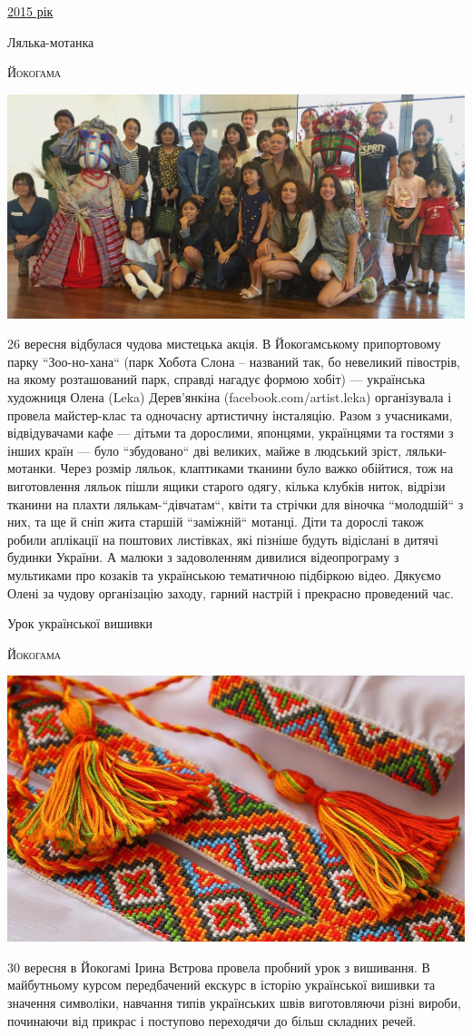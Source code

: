 \documentclass[10pt,a4paper]{article}
\newcommand{\Category}[1]{%
		\begin{center}	
			\Large \usefont{T2A}{kurier}{m}{n}
			\underline{#1}%
		\end{center}	
		\par \normalsize \normalfont}
\newcommand{\NewsItem}[1]{%
		\usefont{T2A}{iwona}{m}{n} 
		\large #1 \vspace{4pt}
		\par \normalsize \normalfont}
\newcommand{\NewsAuthor}[1]{%
			\hfill \textsc{#1} \vspace{4pt}
			\par \normalfont}
\begin{document}
\newpage

\Category{2015 рік}

\begin{multicols}{3}

\NewsItem{Лялька-мотанка}
\NewsAuthor{Йокогама}
\begin{center}
\includegraphics[width=0.8\linewidth]{images/1}
\end{center}
26 вересня відбулася чудова мистецька акція. В Йокогамському припортовому парку ``Зоо-но-хана`` (парк Хобота Слона – названий так, бо невеликий півострів, на якому розташований парк, справді нагадує формою хобіт) — українська художниця Олена (Leka) Дерев’янкіна (facebook.com/artist.leka) організувала і провела майстер-клас та одночасну артистичну інсталяцію. Разом з учасниками, відвідувачами кафе — дітьми та дорослими, японцями, українцями та гостями з інших країн — було ``збудовано`` дві великих, майже в людський зріст, ляльки-мотанки. Через розмір ляльок, клаптиками тканини було важко обійтися, тож на виготовлення ляльок пішли ящики старого одягу, кілька клубків ниток, відрізи тканини на плахти лялькам-``дівчатам``, квіти та стрічки для віночка ``молодшій`` з них, та ще й сніп жита старшій ``заміжній`` мотанці. Діти та дорослі також робили аплікації на поштових листівках, які пізніше будуть відіслані в дитячі будинки України. А малюки з задоволенням дивилися відеопрограму з мультиками про козаків та українською тематичною підбіркою відео. Дякуємо Олені за чудову організацію заходу, гарний настрій і прекрасно проведений час.

\vspace{1cm}

\NewsItem{Урок української вишивки}
\NewsAuthor{Йокогама}
\begin{center}
\includegraphics[width=0.8\linewidth]{images/2}
\end{center}
30 вересня в Йокогамі Ірина Вєтрова провела пробний урок з вишивання. В майбутньому курсом передбачений екскурс в історію української вишивки та значення символіки, навчання типів українських швів виготовляючи різні вироби, починаючи від прикрас і поступово переходячи до більш складних речей. 


\end{multicols}
\end{document}
